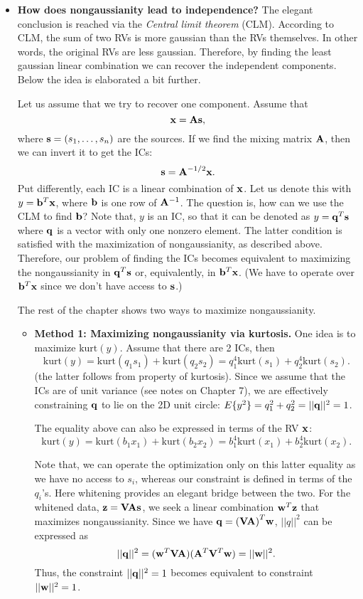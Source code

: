 \documentclass[a4paper, one	side]{book}
\begin{document}
\begin{itemize}
\item \textbf{How does nongaussianity lead to independence?} The elegant conclusion is reached via the \textit{Central limit theorem} (CLM). According to CLM, the sum of two \iid RVs is more gaussian than the RVs themselves. In other words, the original RVs are less gaussian. Therefore, by finding the least gaussian linear combination we can recover the independent components. Below the idea is elaborated a bit further.

Let us assume that we try to recover one component. Assume that $$\mathbf{x=As},$$ where $\mathbf{s}=(s_1,\hdots,s_n)$ are the sources. If we find the mixing matrix $\mathbf A$, then we can invert it to get the ICs: $$\mathbf{s=A}^{-1/2}\mathbf{x}.$$
Put differently, each IC is a linear combination of $\mathbf{x}$. Let us denote this with $y=\mathbf b^T \mathbf x$, where $\mathbf b$ is one row of $\mathbf A^{-1}$. The question is, how can we use the CLM to find $\mathbf b$? Note that, $y$ is an IC, so that it can be denoted as $y =\mathbf{q}^T \mathbf s$ where $\mathbf q$ is a vector with only one nonzero element. The latter condition is satisfied with the maximization of nongaussianity, as described above. Therefore, our problem of finding the ICs becomes equivalent to maximizing the nongaussianity in $\mathbf{q}^T \mathbf s$ or, equivalently, in $\mathbf b ^T \mathbf x$. (We have to operate over $\mathbf b^T \mathbf x$ since we don't have access to $\mathbf s$.)

The rest of the chapter shows two ways to maximize nongaussianity.

\begin{itemize}

\item \textbf{Method 1: Maximizing nongaussianity via kurtosis.} One idea is to maximize $\text{kurt}(y).$ Assume that there are 2 ICs, then $$\text{kurt}(y)=\text{kurt}(q_1 s_1)+\text{kurt}(q_2 s_2) = q_1^4\text{kurt}( s_1)+q_2 ^4\text{kurt}(s_2). $$ 
(the latter follows from property of kurtosis). Since we assume that the ICs are of unit variance (see notes on Chapter 7), we are effectively constraining $\mathbf q$ to lie on the 2D unit circle: $E\{y^2\}=q_1^2+q_2^2=||\mathbf q||^2=1$.

The equality above can also be expressed in terms of the RV $\mathbf x$:%
$$\text{kurt}(y)=\text{kurt}(b_1 x_1)+\text{kurt}(b_2 x_2) = b_1^4\text{kurt}(x_1)+b_2 ^4\text{kurt}(x_2).$$

Note that, we can operate the optimization only on this latter equality as we have no access to $s_i$, whereas our constraint is defined in terms of the $q_i$'s. Here whitening provides an elegant bridge between the two. For the whitened data, $\mathbf{z=VAs}$, we seek a linear combination $\mathbf w^T \mathbf z$ that maximizes nongaussianity. Since we have $\mathbf{q=(VA)}^T \mathbf{w}$, $||q||^2$ can be expressed as 
$$||\mathbf q||^2 = (\mathbf w^T \mathbf{VA})(\mathbf A^T \mathbf V^T \mathbf w)=||\mathbf w||^2.$$ Thus, the constraint $||\mathbf q||^2=1$ becomes equivalent to constraint $||\mathbf w||^2=1$.


\end{itemize}
\end{itemize}
\end{document}

